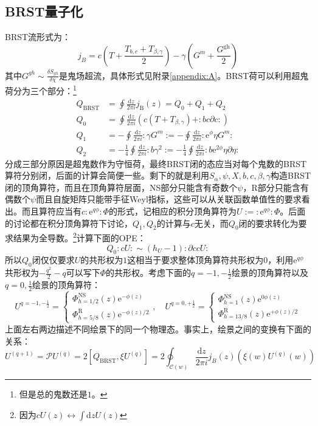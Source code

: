 \subsection{BRST量子化}
BRST流形式为：
\begin{equation}
	j_B=c\left(T+\frac{T_{b,c}+T_{\beta,\gamma}}{2}\right)-\gamma\left(G^m+\frac{G^{\mathrm{gh}}}{2}\right)
\end{equation}
其中$G^{gh}\sim\frac{\delta S_{gh}}{\delta\chi}$是鬼场超流，具体形式见附录\ref{appendix:A}。BRST荷可以利用超鬼荷分为三个部分：\footnote{但是总的鬼数还是$1$。}
\begin{equation}
	\begin{aligned}
		Q_{\mathrm{BRST}}&=\oint\frac{\mathrm{d}z}{2\pi i}j_{\mathrm{B}}(z)=Q_0+Q_1+Q_2\\Q_{0}&=\oint\frac{\mathrm{d}z}{2\pi i}\left(c(T+T_{\beta,\gamma})+:bc\partial c:\right)\\Q_{1}&=-\oint\frac{\mathrm{d}z}{2\pi i}:\gamma G^m:=-\oint\frac{\mathrm{d}z}{2\pi i}:\mathrm{e}^\phi\eta G^m:\\Q_{2}&=-\frac{1}{4}\oint\frac{\mathrm{d}z}{2\pi i}:b\gamma^2:=-\frac{1}{4}\oint\frac{\mathrm{d}z}{2\pi i}:b\mathrm{e}^{2\phi}\eta\partial\eta:
	\end{aligned}
\end{equation}
分成三部分原因是超鬼数作为守恒荷，最终BRST闭的态应当对每个鬼数的BRST算符分别闭，后面的计算会简便一些。剩下的就是利用$S_\alpha,\psi,X,b,c,\beta,\gamma$构造BRST闭的顶角算符，而且在顶角算符层面，NS部分只能含有奇数个$\psi$，R部分只能含有偶数个$\psi$而且自旋矩阵只能带手征Weyl指标，这些可以从关联函数单值性的要求看出。而且算符应当有$c:\mathrm{e}^{q\phi}:\Phi$的形式，记相应的积分顶角算符为$U:=:\mathrm{e}^{q\phi}:\Phi$。后面的讨论都在积分顶角算符下讨论，$Q_1,Q_2$的计算与$c$无关，而$Q_0$闭的要求转化为要求结果为全导数。\footnote{因为$cU(z)\leftrightarrow\int \mathrm{d}z U(z)$}计算下面的OPE：
\begin{equation}
	Q_0:cU: \sim (h_U-1):\partial c c U:
\end{equation}
所以$Q_0$闭仅仅要求$U$的共形权为$1$这相当于要求整体顶角算符共形权为$0$，利用$\mathrm{e}^{q\phi}$共形权为$-\frac{q^2}{2}-q$可以写下$\Phi$的共形权。考虑下面的$q=-1,-\frac12$绘景的顶角算符以及$q=0,\frac12$绘景的顶角算符：
\begin{equation}
	U^{q=-1,-\frac12} = \begin{cases}
		\Phi_{h=1/2}^{\mathrm{NS}}(z)\mathrm{e}^{-\phi(z)}\\
		\Phi_{h=5/8}^{\mathrm{R}}(z)\mathrm{e}^{-\phi(z)/2}
	\end{cases},\quad 
	U^{q=0,+\frac12} = \begin{cases}
		\Phi_{h=1}^{\mathrm{NS}}(z)\mathrm{e}^{0\phi(z)}\\
		\Phi_{h=13/8}^{\mathrm{R}}(z)\mathrm{e}^{+\phi(z)/2}
	\end{cases}
\end{equation}
上面左右两边描述不同绘景下的同一个物理态。事实上，绘景之间的变换有下面的关系：
\begin{equation}
	\label{eq:PCO}
	U^{(q+1)}=\mathcal{P}U^{(q)}=2[Q_{\mathrm{BRST}},\xi U^{(q)}]=2\oint_{\mathcal{C}(w)}\frac{\mathrm{d}z}{2\pi i }j_B(z)\left(\xi(w)U^{(q)}(w)\right)
\end{equation}

